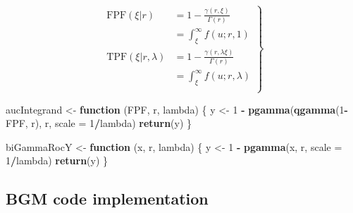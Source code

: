 \documentclass[
]{book}
\newenvironment{Shaded}{\begin{snugshade}}{\end{snugshade}}
\newcommand{\ControlFlowTok}[1]{\textcolor[rgb]{0.13,0.29,0.53}{\textbf{#1}}}
\newcommand{\DataTypeTok}[1]{\textcolor[rgb]{0.13,0.29,0.53}{#1}}
\newcommand{\DecValTok}[1]{\textcolor[rgb]{0.00,0.00,0.81}{#1}}
\newcommand{\KeywordTok}[1]{\textcolor[rgb]{0.13,0.29,0.53}{\textbf{#1}}}
\newcommand{\NormalTok}[1]{#1}
\newcommand{\OperatorTok}[1]{\textcolor[rgb]{0.81,0.36,0.00}{\textbf{#1}}}
\newcommand{\StringTok}[1]{\textcolor[rgb]{0.31,0.60,0.02}{#1}}
\begin{document}
\begin{equation}
\left.\begin{aligned}
\text{FPF}\left( \xi|r \right) &= 1 - \frac{\gamma\left( r,\xi \right)}{\Gamma\left( r \right)} \\
&=\int_{\xi}^{\infty} f\left( u;r,1 \right) \\
\text{TPF}\left( \xi|r, \lambda \right) &= 1 - \frac{\gamma\left( r,\lambda \xi \right)}{\Gamma\left( r \right)} \\
&=\int_{\xi}^{\infty} f\left( u;r,\lambda \right) \\
\end{aligned}\right\}
\label{eq:proper-roc-models-gamma-fpf-tpf}
\end{equation}

\begin{Shaded}
\begin{Highlighting}[]
\NormalTok{aucIntegrand <-}\StringTok{ }\ControlFlowTok{function}\NormalTok{ (FPF, r, lambda) }
\NormalTok{\{}
\NormalTok{  y <-}\StringTok{ }\DecValTok{1} \OperatorTok{-}\StringTok{ }\KeywordTok{pgamma}\NormalTok{(}\KeywordTok{qgamma}\NormalTok{(}\DecValTok{1}\OperatorTok{-}\NormalTok{FPF, r), r, }\DataTypeTok{scale =} \DecValTok{1}\OperatorTok{/}\NormalTok{lambda)}
  \KeywordTok{return}\NormalTok{(y)  }
\NormalTok{\}}


\NormalTok{biGammaRocY <-}\StringTok{ }\ControlFlowTok{function}\NormalTok{ (x, r, lambda) \{}
\NormalTok{  y <-}\StringTok{ }\DecValTok{1} \OperatorTok{-}\StringTok{ }\KeywordTok{pgamma}\NormalTok{(x, r, }\DataTypeTok{scale =} \DecValTok{1}\OperatorTok{/}\NormalTok{lambda)}
  \KeywordTok{return}\NormalTok{(y)}
\NormalTok{\}}
\end{Highlighting}
\end{Shaded}

\hypertarget{proper-roc-models-bigamma-code}{%
\subsection{BGM code implementation}\label{proper-roc-models-bigamma-code}}
\end{document}
